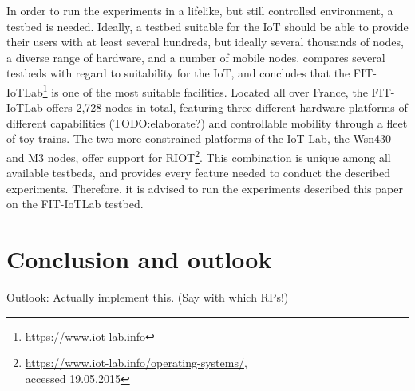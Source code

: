 \documentclass{acm_proc_article-sp}
\begin{document}
In order to run the experiments in a lifelike, but still controlled environment, a testbed is needed. Ideally, a testbed suitable for the IoT should be able to provide their users with at least several hundreds, but ideally several thousands of nodes, a diverse range of hardware, and a number of mobile nodes. \cite{testbed-survey} compares several testbeds with regard to suitability for the IoT, and concludes that the FIT-IoTLab\footnote{\url{https://www.iot-lab.info}} is one of the most suitable facilities. Located all over France, the FIT-IoTLab offers 2,728 nodes in total, featuring three different hardware platforms of different capabilities (TODO:elaborate?) and controllable mobility through a fleet of toy trains. The two more constrained platforms of the IoT-Lab, the Wsn430 and M3 nodes, offer support for RIOT\footnote{\url{https://www.iot-lab.info/operating-systems/}, \\accessed 19.05.2015}.
This combination is unique among all available testbeds, and provides every feature needed to conduct the described experiments. Therefore, it is advised to run the experiments described this paper on the FIT-IoTLab testbed.

\section{Conclusion and outlook}
\label{sec:Conclusion}

Outlook: Actually implement this. (Say with which RPs!)



\end{document}
